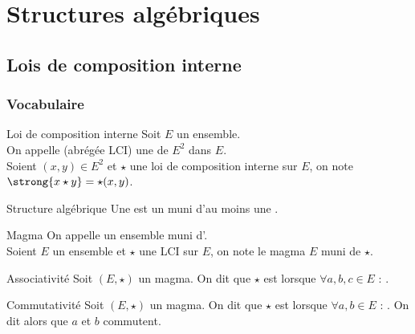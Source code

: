 \documentclass[12pt,a4paper]{report}
\begin{document}
\chapter{Structures algébriques}
\section{Lois de composition interne}

    \subsection{Vocabulaire}
    
    \begin{definition}{Loi de composition interne}{}
    Soit $E$ un ensemble.\\
    On appelle  (abrégée LCI) une  de $E^2$ dans $E$.\\
    Soient $(x, y) \in E^2$ et $\star$ une loi de composition interne sur $E$, on note $\strong{x \star y} = \star(x ,y)$.
    \end{definition}
    
    \begin{definition}{Structure algébrique}{}
    Une  est un  muni d'au moins une .
    \end{definition}
    
    \begin{definition}{Magma}{}
    On appelle  un ensemble muni d'.\\
    Soient $E$ un ensemble et $\star$ une LCI sur $E$, on note  le magma $E$ muni de $\star$.
    \end{definition}
    
    \begin{definition}{Associativité}{}
    Soit $(E, \star)$ un magma. On dit que $\star$ est  lorsque $\forall a, b, c \in E$ : .
    \end{definition}
    
    \begin{definition}{Commutativité}{}
    Soit $(E, \star)$ un magma. On dit que $\star$ est  lorsque $\forall a, b \in E$ : . On dit alors que $a$ et $b$ commutent.
    \end{definition}
    
\end{document}
